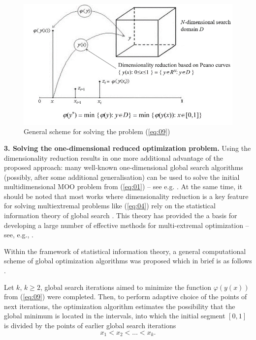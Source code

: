 \documentclass[runningheads]{llncs}
\begin{document}
\begin{figure}
  \centering
  \includegraphics[width=\linewidth]{fig1}
  \caption{General scheme for solving the problem (\ref{eq:09})}
  \label{fig:1}
\end{figure}

\textbf{3. Solving the one-dimensional reduced optimization problem.} Using the dimensionality reduction results in one more additional advantage of the proposed approach: many well-known one-dimensional global search algorithms (possibly, after some additional generalisation) can be used to solve the initial multidimensional MOO problem from (\ref{eq:01}) -- see e.g. \cite{c22,c23,c24,c25,c26,c27,c28,c29}. At the same time, it should be noted that most works where dimensionality reduction is a key feature for solving multiextremal problems like (\ref{eq:04}) rely on the statistical information theory of global search \cite{c15}. This theory has provided the a basis for developing a large number of effective methods for multi-extremal optimization -- see, e.g., \cite{c28,c29,c30,c31,c32,c33,c34,c35,c36,c37}.

Within the framework of statistical information theory, a general computational scheme of global optimization algorithms was proposed which in brief is as follows \cite{c15,c30,c35}.

Let $k$, $k \geq 2$, global search iterations aimed to minimize the function $\varphi(y(x))$ from (\ref{eq:09}) were completed. Then, to perform adaptive choice of the points of next iterations, the optimization algorithm estimates the possibility that the global minimum is located  in the intervals, into which the initial segment $[0,1]$ is divided by the points of earlier global search  iterations
\begin{equation}
\label{eq:11}
x_1<x_2< \dots <x_k.
\end{equation}
\end{document}
